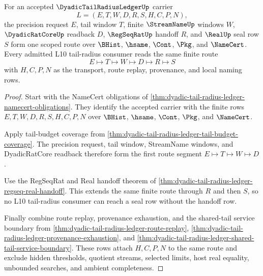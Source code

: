 \begin{theorem}
\label{thm:dyadic-tail-radius-ledger-scoped-route-package}
For an accepted $\DyadicTailRadiusLedgerUp$ carrier
$$
L=(E,T,W,D,R,S,H,C,P,N),
$$
the precision request $E$, tail window $T$, finite $\StreamNameUp$ windows $W$, $\DyadicRatCoreUp$ readback $D$, $\RegSeqRatUp$ handoff $R$, and $\RealUp$ seal row $S$ form one scoped route over $\BHist$, $\hsame$, $\Cont$, $\Pkg$, and $\NameCert$. Every admitted L10 tail-radius consumer reads the same finite route
$$
E \longmapsto T \longmapsto W \longmapsto D \longmapsto R \longmapsto S
$$
with $H,C,P,N$ as the transport, route replay, provenance, and local naming rows.
\end{theorem}
\begin{proof}
Start with the NameCert obligations of \autoref{thm:dyadic-tail-radius-ledger-namecert-obligations}. They identify the accepted carrier with the finite rows $E,T,W,D,R,S,H,C,P,N$ over $\BHist$, $\hsame$, $\Cont$, $\Pkg$, and $\NameCert$.

Apply tail-budget coverage from \autoref{thm:dyadic-tail-radius-ledger-tail-budget-coverage}. The precision request, tail window, StreamName windows, and DyadicRatCore readback therefore form the first route segment $E \longmapsto T \longmapsto W \longmapsto D$.

Use the RegSeqRat and Real handoff theorem of \autoref{thm:dyadic-tail-radius-ledger-regseq-real-handoff}. This extends the same finite route through $R$ and then $S$, so no L10 tail-radius consumer can reach a seal row without the handoff row.

Finally combine route replay, provenance exhaustion, and the shared-tail service boundary from \autoref{thm:dyadic-tail-radius-ledger-route-replay}, \autoref{thm:dyadic-tail-radius-ledger-provenance-exhaustion}, and \autoref{thm:dyadic-tail-radius-ledger-shared-tail-service-boundary}. These rows attach $H,C,P,N$ to the same route and exclude hidden thresholds, quotient streams, selected limits, host real equality, unbounded searches, and ambient completeness.
\end{proof}

